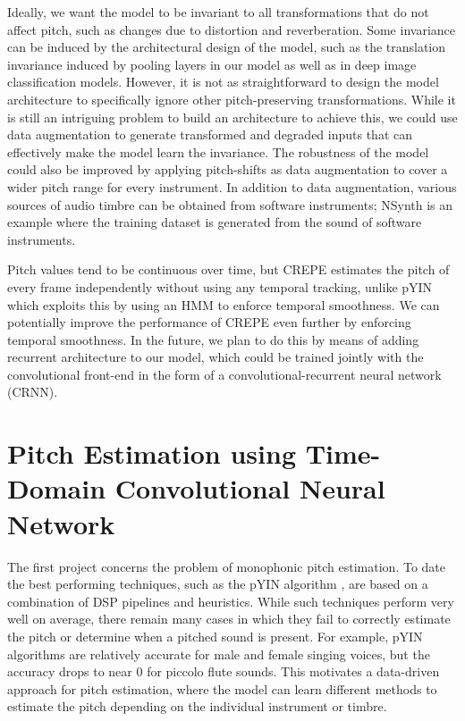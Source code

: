 Ideally, we want the model to be invariant to all transformations that do not affect pitch, such as changes due to distortion and reverberation.
Some invariance can be induced by the architectural design of the model, such as the translation invariance induced by pooling layers in our model as well as in deep image classification models.
However, it is not as straightforward to design the model architecture to specifically ignore other pitch-preserving transformations.
While it is still an intriguing problem to build an architecture to achieve this, we could use data augmentation to generate transformed and degraded inputs that can effectively make the model learn the invariance.
The robustness of the model could also be improved by applying pitch-shifts as data augmentation \cite{mcfee2015muda} to cover a wider pitch range for every instrument.
In addition to data augmentation, various sources of audio timbre can be obtained from software instruments; NSynth \cite{engel2017nsynth} is an example where the training dataset is generated from the sound of software instruments.


Pitch values tend to be continuous over time, but CREPE estimates the pitch of every frame independently without using any temporal tracking, unlike pYIN which exploits this by using an HMM to enforce temporal smoothness.
We can potentially improve the performance of CREPE even further by enforcing temporal smoothness.
In the future, we plan to do this by means of adding recurrent architecture to our model, which could be trained jointly with the convolutional front-end in the form of a convolutional-recurrent neural network (CRNN).


\section{Pitch Estimation using Time-Domain Convolutional Neural Network}


The first project concerns the problem of monophonic pitch estimation.
To date the best performing techniques, such as the pYIN algorithm \cite{mauch2014pyin}, are based on a combination of DSP pipelines and heuristics.
While such techniques perform very well on average, there remain many cases in which they fail to correctly estimate the pitch or determine when a pitched sound is present.
For example, pYIN algorithms are relatively accurate for male and female singing voices, but the accuracy drops to near 0 for piccolo flute sounds.
This motivates a data-driven approach for pitch estimation, where the model can learn different methods to estimate the pitch depending on the individual instrument or timbre.

